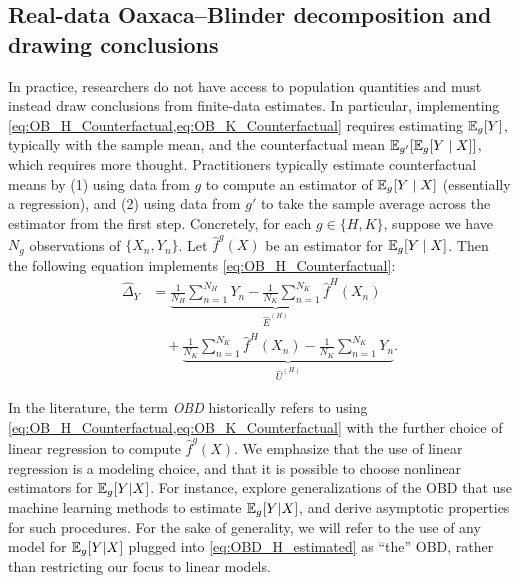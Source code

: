 % 

\subsection{Real-data Oaxaca--Blinder decomposition and drawing conclusions} 
\label{sec:ob_real}
In practice, researchers do not have access to population quantities and must instead draw conclusions from finite-data estimates.
In particular, implementing \cref{eq:OB_H_Counterfactual,eq:OB_K_Counterfactual} requires estimating $\mathbb{E}_g[Y]$, typically with the sample mean, and the counterfactual mean $\mathbb{E}_{g'}[\mathbb{E}_g[Y \mid X]]$, which requires more thought. 
Practitioners typically estimate counterfactual means by (1) using data from $g$ to compute an estimator of $\mathbb{E}_g[Y \mid X]$ (essentially a regression), and (2) using data from $g'$ to take the sample average across the estimator from the first step.
Concretely, for each $g \in {\{H, K\}}$, suppose we have $N_g$ observations of $\{X_n, Y_n\}$. Let $\hat{f}^g(X)$ be an estimator for $\mathbb{E}_g[Y \mid X]$.
Then the following equation implements \cref{eq:OB_H_Counterfactual}:
\begin{align}	
    \hat{\Delta}_Y
    \label{eq:OBD_H_estimated}
    &=\underbrace{ \frac{1}{N_H} \sum_{n=1}^{N_H} Y_n - \frac{1}{N_K} \sum_{n=1}^{N_K} \hat{f}^H(X_n)}_{\hat{E}^{(H)}} \nonumber \\
    &\quad + \underbrace{\frac{1}{N_K} \sum_{n=1}^{N_K} \hat{f}^H(X_n) - \frac{1}{N_K} \sum_{n=1}^{N_K} Y_n}_{\hat{U}^{(H)} }.
\end{align}

In the literature, the term \emph{OBD} historically refers to using \cref{eq:OB_H_Counterfactual,eq:OB_K_Counterfactual} with the further choice of linear regression to compute $\hat{f}^g(X)$.
We emphasize that the use of linear regression is a modeling choice, and that it is possible to choose nonlinear estimators for $\mathbb{E}_g  [ Y | X ]$.
For instance, \citet{quintas2024multiply,flachaire2025decomposing,mao2025double} explore generalizations of the OBD that use machine learning methods to estimate $\mathbb{E}_g  [ Y | X ]$, and derive asymptotic properties for such procedures.
For the sake of generality, we will refer to the use of any model for $\mathbb{E}_g[Y|X]$ plugged into \cref{eq:OBD_H_estimated} as ``the'' OBD, rather than restricting our focus to linear models.

